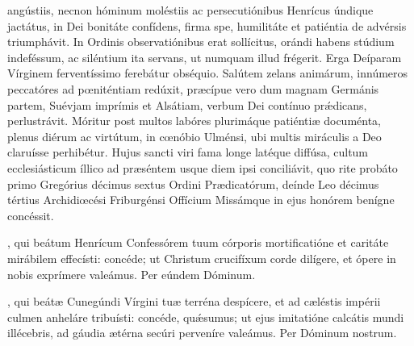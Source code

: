 \documentclass[fontsize=9pt,paper=A6,twoside,BCOR=1mm,DIV=22,headinclude]{scrarticle}
\begin{document}
\begin{multicols}{2}
{
 angústiis, necnon hóminum moléstiis ac persecutiónibus Henrícus úndique jactátus, in Dei bonitáte confídens, firma spe, humilitáte et patiéntia de advérsis triumphávit. In Ordinis observatiónibus erat sollícitus, orándi habens stúdium indeféssum, ac siléntium ita servans, ut numquam illud frégerit. Erga Deíparam Vírginem ferventíssimo ferebátur obséquio. Salútem zelans animárum, innúmeros peccatóres ad pœniténtiam redúxit, præcípue vero dum magnam Germánis partem, Suévjam imprímis et Alsátiam, verbum Dei contínuo pr\'ædicans, perlustrávit. Móritur post multos labóres plurimáque patiéntiæ documénta, plenus diérum ac virtútum, in cœnóbio Ulménsi, ubi multis miráculis a Deo claruísse perhibétur. Hujus sancti viri fama longe latéque diffúsa, cultum ecclesiásticum íllico ad præséntem usque diem ipsi conciliávit, quo rite probáto primo Gregórius décimus sextus Ordini Prædicatórum, deínde Leo décimus tértius Archidiœcési Friburgénsi Offícium Missámque in ejus honórem benígne concéssit.

\RVCvi 




\VRCii 

\BC 

, qui beátum Henrícum Confessórem tuum córporis mortificatióne et caritáte mirábilem effecísti: concéde; ut Christum crucifíxum corde dilígere, et ópere in nobis exprímere valeámus. Per eúndem Dóminum.



}



{
\VRVi 

\MiV 

, qui beátæ Cunegúndi Vírgini tuæ terréna despícere, et ad cæléstis impérii culmen anheláre tribuísti: concéde, qu\'æsumus; ut ejus imitatióne calcátis mundi illécebris, ad gáudia ætérna secúri perveníre valeámus. Per Dóminum nostrum.


\MiiC 

}
\end{multicols}
\end{document}

